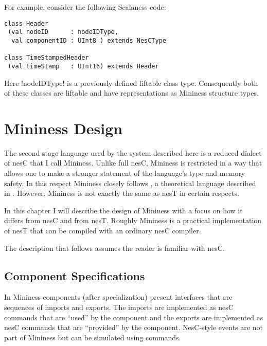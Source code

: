 For example, consider the following Scalaness code:

\singlespace
\begin{lstlisting}[language=scalaness]
class Header
 (val nodeID      : nodeIDType,
  val componentID : UInt8 ) extends NesCType

class TimeStampedHeader
 (val timeStamp   : UInt16) extends Header
\end{lstlisting}
\primaryspacing

Here !nodeIDType! is a previously defined liftable class type. Consequently both of these
classes are liftable and have representations as Mininess structure types. 

\section{Mininess Design}
\label{section-mininess-design}

\lstset{language=nesC}

The second stage language used by the system described here is a reduced dialect of nesC that I
call Mininess. Unlike full nesC, Mininess is restricted in a way that allows one to make a
stronger statement of the language's type and memory safety.  In this respect
Mininess closely follows , a theoretical language described in \cite{XXX}.
However, Mininess is not exactly the same as nesT in certain respects. 

In this chapter I will describe the design of Mininess with a focus on how it differs from nesC
and from nesT. Roughly Mininess is a practical implementation of nesT that can be compiled with
an ordinary nesC compiler.

The description that follows assumes the reader is familiar with nesC.


\subsection{Component Specifications}
\label{section-component-specifications-design}

In Mininess components (after specialization) present interfaces that are sequences of imports
and exports. The imports are implemented as nesC commands that are ``used'' by the component and
the exports are implemented as nesC commands that are ``provided'' by the component. NesC-style
events are not part of Mininess but can be simulated using commands.

